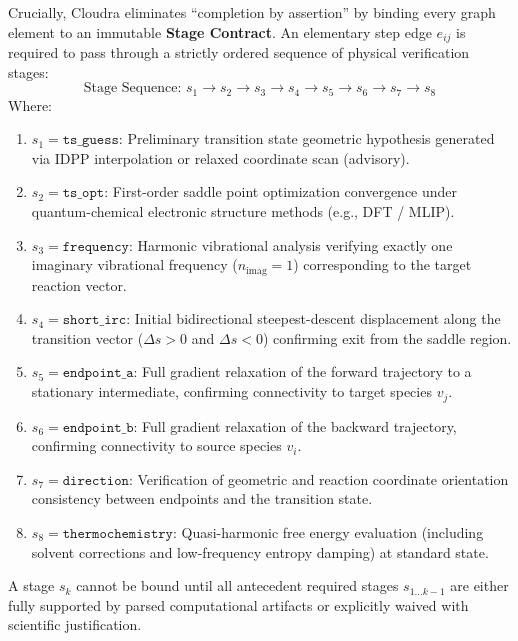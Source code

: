 \documentclass[10pt,twocolumn,letterpaper]{article}
\begin{document}
Crucially, Cloudra eliminates ``completion by assertion'' by binding every graph element to an immutable \textbf{Stage Contract}. An elementary step edge $e_{ij}$ is required to pass through a strictly ordered sequence of physical verification stages:
\begin{equation}
\text{Stage Sequence: } s_1 \rightarrow s_2 \rightarrow s_3 \rightarrow s_4 \rightarrow s_5 \rightarrow s_6 \rightarrow s_7 \rightarrow s_8
\end{equation}
Where:
\begin{enumerate}[leftmargin=*]
\item $s_1 = \texttt{ts\_guess}$: Preliminary transition state geometric hypothesis generated via IDPP interpolation or relaxed coordinate scan (advisory).
\item $s_2 = \texttt{ts\_opt}$: First-order saddle point optimization convergence under quantum-chemical electronic structure methods (e.g., DFT / MLIP).
\item $s_3 = \texttt{frequency}$: Harmonic vibrational analysis verifying exactly one imaginary vibrational frequency ($n_\mathrm{imag} = 1$) corresponding to the target reaction vector.
\item $s_4 = \texttt{short\_irc}$: Initial bidirectional steepest-descent displacement along the transition vector ($\Delta s > 0$ and $\Delta s < 0$) confirming exit from the saddle region.
\item $s_5 = \texttt{endpoint\_a}$: Full gradient relaxation of the forward trajectory to a stationary intermediate, confirming connectivity to target species $v_j$.
\item $s_6 = \texttt{endpoint\_b}$: Full gradient relaxation of the backward trajectory, confirming connectivity to source species $v_i$.
\item $s_7 = \texttt{direction}$: Verification of geometric and reaction coordinate orientation consistency between endpoints and the transition state.
\item $s_8 = \texttt{thermochemistry}$: Quasi-harmonic free energy evaluation (including solvent corrections and low-frequency entropy damping) at standard state.
\end{enumerate}

A stage $s_k$ cannot be bound until all antecedent required stages $s_{1 \dots k-1}$ are either fully supported by parsed computational artifacts or explicitly waived with scientific justification.
\end{document}
